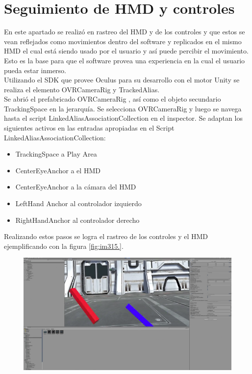 \section{Seguimiento de HMD y controles}
En este apartado se realizó en rastreo del HMD y de los controles y que estos se vean reflejados como movimientos dentro del software y replicados en el mismo HMD el cual está siendo usado por el usuario y así puede percibir el movimiento. Esto es la base para que el software provea una experiencia en la cual el usuario pueda estar inmerso.\\

Utilizando el SDK que provee Oculus para su desarrollo con el motor Unity se realiza el elemento OVRCameraRig y TrackedAlias.\\

Se abrió el prefabricado OVRCameraRig , así como el objeto secundario TrackingSpace en la jerarquía. Se selecciona OVRCameraRig y luego se navega hasta el script LinkedAliasAssociationCollection en el inspector. Se adaptan los siguientes activos en las entradas apropiadas en el Script LinkedAliasAssociationCollection:\\
\begin{itemize}
    \item TrackingSpace a Play Area
    \item CenterEyeAnchor a el HMD
    \item CenterEyeAnchor a la cámara del HMD
    \item LeftHand Anchor al controlador izquierdo
    \item RightHandAnchor al controlador derecho
\end{itemize}
Realizando estos pasos se logra el rastreo de los controles y el HMD ejemplificando con la figura \ref{fig:im315.}.
\begin{figure}[H]
	\begin{center}
 		\includegraphics[width = .7\textwidth]{source/images/image44.png}
	\end{center} 
\end{figure}

